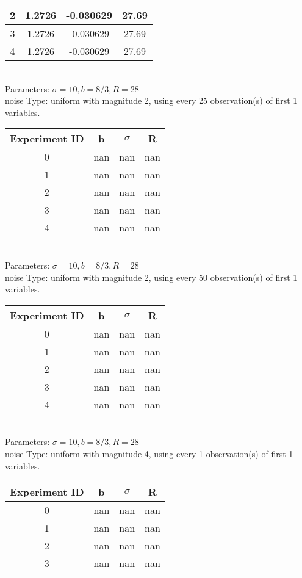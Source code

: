 \begin{multicols}{3}
\begin{tabular}{cccc}
 2 & 1.2726 & -0.030629 & 27.69\\ \hline 
 3 & 1.2726 & -0.030629 & 27.69\\ \hline 
 4 & 1.2726 & -0.030629 & 27.69\\ \hline 
 \end{tabular}\\
Parameters: $\sigma=10, b=8/3, R=28$\\
noise Type: uniform with magnitude 2, using every 25 observation(s) of first 1 variables.\\
\begin{tabular}{cccc}
\hline Experiment ID & b & $\sigma$ & R \\ \hline 
0 & nan & nan & nan\\ \hline 
 1 & nan & nan & nan\\ \hline 
 2 & nan & nan & nan\\ \hline 
 3 & nan & nan & nan\\ \hline 
 4 & nan & nan & nan\\ \hline 
 \end{tabular}\\
Parameters: $\sigma=10, b=8/3, R=28$\\
noise Type: uniform with magnitude 2, using every 50 observation(s) of first 1 variables.\\
\begin{tabular}{cccc}
\hline Experiment ID & b & $\sigma$ & R \\ \hline 
0 & nan & nan & nan\\ \hline 
 1 & nan & nan & nan\\ \hline 
 2 & nan & nan & nan\\ \hline 
 3 & nan & nan & nan\\ \hline 
 4 & nan & nan & nan\\ \hline 
 \end{tabular}\\
Parameters: $\sigma=10, b=8/3, R=28$\\
noise Type: uniform with magnitude 4, using every 1 observation(s) of first 1 variables.\\
\begin{tabular}{cccc}
\hline Experiment ID & b & $\sigma$ & R \\ \hline 
0 & nan & nan & nan\\ \hline 
 1 & nan & nan & nan\\ \hline 
 2 & nan & nan & nan\\ \hline 
 3 & nan & nan & nan\\ \hline 

\end{tabular}
\end{multicols}

